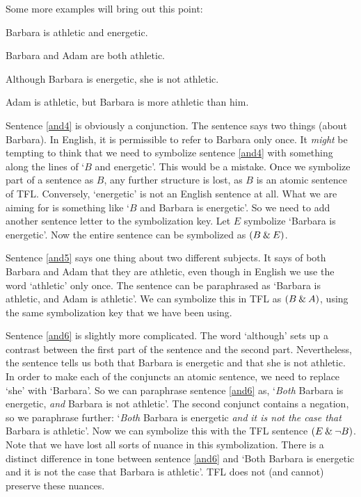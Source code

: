 Some more examples will bring out this point:
	\begin{earg}
		\item[\ex{and4}]Barbara is athletic and energetic.
		\item[\ex{and5}]Barbara and Adam are both athletic.
		\item[\ex{and6}]Although Barbara is energetic, she is not athletic.
	\item[\ex{and7}]Adam is athletic, but Barbara is more athletic than him.
	\end{earg}
Sentence \ref{and4} is obviously a conjunction. The sentence says two things (about Barbara). In English, it is permissible to refer to Barbara only once. It \emph{might} be tempting to think that we need to symbolize sentence \ref{and4} with something along the lines of `$B$ and energetic'. This would be a mistake. Once we symbolize part of a sentence as $B$, any further structure is lost, as $B$ is an atomic sentence of TFL. Conversely, `energetic' is not an English sentence at all. What we are aiming for is something like `$B$ and Barbara is energetic'. So we need to add another sentence letter to the symbolization key. Let $E$ symbolize `Barbara is energetic'. Now the entire sentence can be symbolized as $(B\mathbin{\&} E)$.

Sentence \ref{and5} says one thing about two different subjects. It says of both Barbara and Adam that they are athletic, even though in English we use the word `athletic' only once. The sentence can be paraphrased as `Barbara is athletic, and Adam is athletic'. We can symbolize this in TFL as $(B\mathbin{\&} A)$, using the same symbolization key that we have been using.

Sentence \ref{and6} is slightly more complicated. The word `although' sets up a contrast between the first part of the sentence and the second part. Nevertheless, the sentence tells us both that Barbara is energetic and that she is not athletic. In order to make each of the conjuncts an atomic sentence, we need to replace `she' with `Barbara'. So we can paraphrase sentence \ref{and6} as, `\emph{Both} Barbara is energetic, \emph{and} Barbara is not athletic'. The second conjunct contains a negation, so we paraphrase further: `\emph{Both} Barbara is energetic \emph{and} \emph{it is not the case that} Barbara is athletic'. Now we can symbolize this with the TFL sentence $(E\mathbin{\&}\neg B)$. Note that we have lost all sorts of nuance in this symbolization. There is a distinct difference in tone between sentence \ref{and6} and `Both Barbara is energetic and it is not the case that Barbara is athletic'. TFL does not (and cannot) preserve these nuances.

